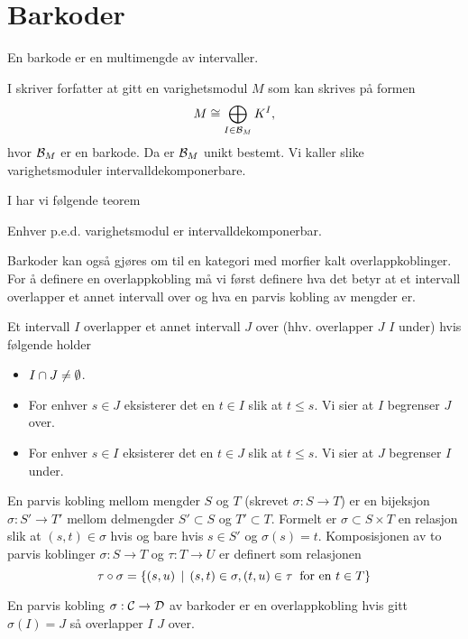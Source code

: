 \section{Barkoder}
En barkode er en multimengde av intervaller.

I \cite{Bauer2015a} skriver forfatter at gitt en varighetsmodul $M$ som kan skrives på formen
\[M\cong\bigoplus_{I\in\mathcal{B}_M}K^I,\]
hvor $\mathcal{B}_M$ er en barkode.
Da er $\mathcal{B}_M$ unikt bestemt. Vi kaller slike varighetsmoduler intervalldekomponerbare.

I \cite{Bauer2015a} har vi følgende teorem
\begin{teorem}\label{Thrm:thrm2.1}
Enhver p.e.d. varighetsmodul er intervalldekomponerbar.
\end{teorem}

Barkoder kan også gjøres om til en kategori med morfier
kalt overlappkoblinger. For å definere en  overlappkobling
må vi først definere hva det betyr at et intervall
overlapper et annet intervall over og hva en parvis
kobling av mengder er.
\begin{definisjon}
    Et intervall $I$ overlapper et annet intervall $J$
    over (hhv. overlapper $J$  $I$ under) hvis følgende
    holder
    \begin{itemize}
        \item $I\cap J\neq\emptyset$.
        \item For enhver $s\in J$ eksisterer det en $t\in I$ slik at $t\leq s$. Vi sier at $I$ begrenser $J$ over.
        \item For enhver $s\in I$ eksisterer det en $t\in J$ slik at $t\leq s$. Vi sier at $J$ begrenser $I$ under.
    \end{itemize}
\end{definisjon}

\begin{definisjon}\label{def:Parvis-Kobling}
  En parvis kobling mellom mengder $S$ og $T$ (skrevet
  $\sigma:S\to T$) er en bijeksjon $\sigma: S'\to T'$
  mellom delmengder $S'\subset S$ og $T'\subset T$.
  Formelt er $\sigma\subset S\times T$ en relasjon slik at
  $(s,t)\in \sigma$ hvis og bare hvis $s\in S'$ og
  $\sigma(s)=t$. Komposisjonen av to parvis koblinger
  $\sigma: S\to T$ og $\tau: T\to U$ er definert som
  relasjonen
  \[\tau\circ\sigma=\left\{(s,u)\,\mid\,(s,t)\in \sigma, (t,u)\in \tau\;\;\text{for en $t\in T$}\right\}\]
\end{definisjon}

\begin{definisjon}\label{def:OverlappMch}
  En parvis kobling $\sigma: \mathcal{C}\to \mathcal{D}$ av barkoder
  er en overlappkobling hvis gitt $\sigma(I)=J$ så
  overlapper $I$ $J$ over.
\end{definisjon}

